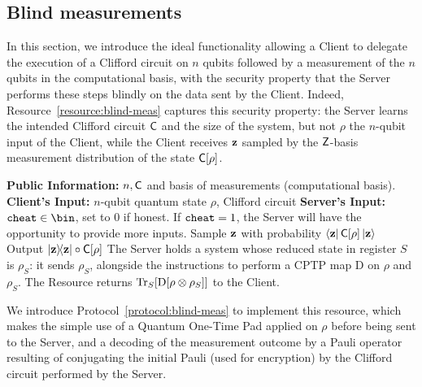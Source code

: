 \subsection{Blind measurements}
\label{subsection:blind:meas}
In this section, we introduce the ideal functionality allowing a Client to delegate the execution of a Clifford circuit on $n$ qubits followed by a measurement of the $n$ qubits in the computational basis, with the security property that the Server performs these steps blindly on the data sent by the Client. Indeed, Resource~\ref{resource:blind-meas} captures this security property: the Server learns the intended Clifford circuit $\mathsf{C}$ and the size of the system, but not $\rho$ the $n$-qubit input of the Client, while the Client receives $\mathbf z$ sampled by the $\mathsf{Z}$-basis measurement distribution of the state $\mathsf{C}[\rho]$.
\begin{resourcee}
    \caption{Blind measurements}
    \label{resource:blind-meas}
    \begin{algorithmic}[1]
        \State \textbf{Public Information:} $n, \mathsf{C}$ and basis of measurements (computational basis).
        \State \textbf{Client's Input:} $n$-qubit quantum state $\rho$, Clifford circuit
        \State \textbf{Server's Input:} $\c\in\bin$, set to $0$ if honest. If $\mathtt{cheat}=1$, the Server will have the opportunity to provide more inputs.
            \State Sample $\mathbf z$ with probability $\bra {\mathbf z} \mathsf{C}[\rho]\ket {\mathbf z}$
            \State Output $ \ketbra \z \circ \C[\rho]$
        \Else
            \State The Server holds a system whose reduced state in register $S$ is $\rho_S$: it sends $\rho_S$, alongside the instructions to perform a CPTP map $\mathrm D$ on $\rho$ and $\rho_S$. The Resource returns $\Tr_S[\mathrm D[\rho\otimes \rho_S]]$ to the Client.
        \EndIf
        \EndProcedure
    \end{algorithmic}
\end{resourcee}
We introduce Protocol~\ref{protocol:blind-meas} to implement this resource, which makes the simple use of a Quantum One-Time Pad applied on $\rho$ before being sent to the Server, and a decoding of the measurement outcome by a Pauli operator resulting of conjugating the initial Pauli (used for encryption) by the Clifford circuit performed by the Server.

